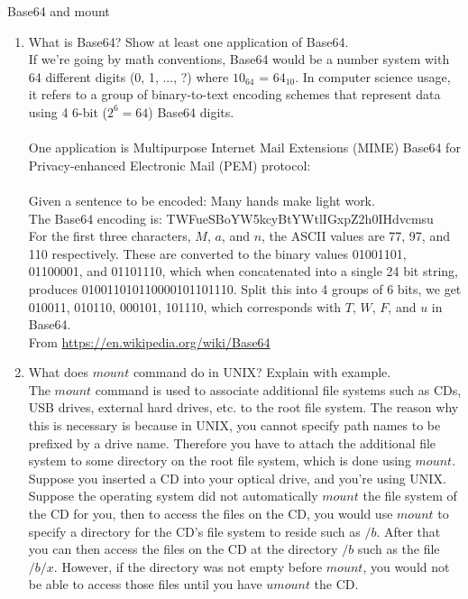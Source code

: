 \documentclass[12pt]{article}
\newenvironment{problem}[2][Problem]{\begin{trivlist}
\item[\hskip \labelsep {\bfseries #1}\hskip \labelsep {\bfseries #2.}]}{\end{trivlist}}
\begin{document}
\begin{problem}{3}
    Base64 and mount
\begin{enumerate}[label=(\alph*)]
    \item What is Base64? Show at least one application of Base64.\\
    If we're going by math conventions, Base64 would be a number system with 64 different digits 
    (0, 1, ..., ?) where $10_{64}$ = $64_{10}$. 
    In computer science usage, it refers to a group of binary-to-text encoding schemes
    that represent data using 4 6-bit ($2^{6} = 64$) Base64 digits.\\\\
    One application is Multipurpose Internet Mail Extensions (MIME) Base64 for Privacy-enhanced Electronic Mail (PEM) protocol:\\\\
    Given a sentence to be encoded: Many hands make light work.\\
    The Base64 encoding is: TWFueSBoYW5kcyBtYWtlIGxpZ2h0IHdvcmsu\\
    For the first three characters, $M$, $a$, and $n$, the ASCII values are 77, 97, and 110 respectively.
    These are converted to the binary values 01001101, 01100001, and 01101110, which when concatenated
    into a single 24 bit string, produces 010011010110000101101110. Split this into 4 groups of 6 bits, we get
    010011, 010110, 000101, 101110, which corresponds with $T$, $W$, $F$, and $u$ in Base64.\\
    From \url{https://en.wikipedia.org/wiki/Base64}
    \item What does $mount$ command do in UNIX? Explain with example.\\
    The $mount$ command is used to associate additional file systems such
    as CDs, USB drives, external hard drives, etc. to the root file system. 
    The reason why this is necessary is because in UNIX, 
    you cannot specify path names to be prefixed by a drive name. 
    Therefore you have to attach the additional file system to some directory 
    on the root file system, which is done using $mount$. Suppose you inserted a CD 
    into your optical drive, and you're using UNIX. Suppose the operating system did not 
    automatically $mount$ the file system of the CD for you, then to access the files 
    on the CD, you would use $mount$ to specify a directory for the CD's file system to reside
    such as $/b$.
    After that you can then access the files on the CD at the directory $/b$ such as the file $/b/x$.
    However, if the directory was not empty before $mount$, you would not be able to access those files 
    until you have $umount$ the CD.
\end{enumerate}
\end{problem}
\end{document}
